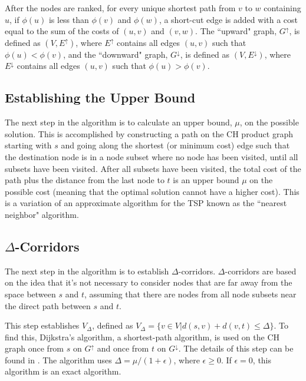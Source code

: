 \documentclass{sig-alternate}
\begin{document}
After the nodes are ranked, for every unique shortest path from $v$ to $w$ containing $u$, if $\phi(u)$  is less than $\phi(v)$ and $\phi(w)$, a short-cut edge is added with a cost equal to the sum of the costs of $(u,v)$ and $(v,w)$. The ``upward" graph, $G^{\uparrow}$, is defined as $(V,E^{\uparrow})$, where $E^{\uparrow}$ contains all edges $(u,v)$ such that $\phi(u) < \phi(v)$, and the ``downward" graph, $G^{\downarrow}$, is defined as $(V,E^{\downarrow})$, where $E^{\downarrow}$ contains all edges $(u,v)$ such that $\phi(u) > \phi(v)$. 



\subsection{Establishing the Upper Bound}
\label{subs:upperbd}
The next step in the algorithm is to calculate an upper bound, $\mu$, on the possible solution. This is accomplished by constructing a path on the CH product graph starting with $s$ and going along the shortest (or minimum cost) edge such that the destination node is in a node subset where no node has been visited, until all subsets have been visited. After all subsets have been visited, the total cost of the path plus the distance from the last node to $t$ is an upper bound $\mu$ on the possible cost (meaning that the optimal solution cannot have a higher cost). This is a variation of an approximate algorithm for the TSP known as the ``nearest neighbor" algorithm. 

\subsection{$\Delta$-Corridors}
\label{subs:deltacorridors}

The next step in the algorithm is to establish $\Delta$-corridors. $\Delta$-corridors are based on the idea that it's not necessary to consider nodes that are far away from the space between $s$ and $t$, assuming that there are nodes from all node subsets near the direct path between $s$ and $t$. 

This step establishes $V_{\Delta}$, defined as $V_{\Delta}=\{v \in V | d(s,v) + d(v,t) \leq \Delta \}$. To find this, Dijkstra's algorithm, a shortest-path algorithm, is used on the CH graph once from $s$ on $G^{\uparrow}$ and once from $t$ on $G^{\downarrow}$. The details of this step can be found in \cite{Rice:2013}. The algorithm uses $\Delta = \mu /(1+\epsilon)$, where $\epsilon \geq 0$. If $\epsilon=0$, this algorithm is an exact algorithm. 
\end{document}
